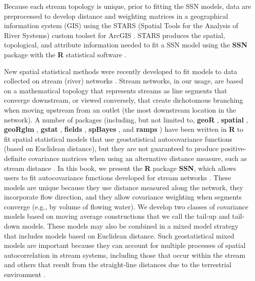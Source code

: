 \documentclass[]{book}
\theoremstyle{definition}
\theoremstyle{definition}
\theoremstyle{definition}
\theoremstyle{remark}
\begin{document}
Because each stream topology is unique, prior to fitting the SSN models,
data are preprocessed to develop distance and weighting matrices in a
geographical information system (GIS) using the STARS (Spatial Tools for
the Analysis of River Systems) custom toolset \citep{Pete:Ver:STAR:2014}
for ArcGIS \citep{ESRI:ArcG:2014}. STARS produces the spatial,
topological, and attribute information needed to fit a SSN model using
the \textbf{SSN} package \citep{Ver:Pete:Clif:Shah:SSN:2014} with the
\textbf{R} statistical software \citep{R:Deve:Core:ALan:2015}.

New spatial statistical methods were recently developed to fit models to
data collected on stream (river) networks \citep{Ver:Pete:Move:2010}.
Stream networks, in our usage, are based on a mathematical topology that
represents streams as line segments that converge downstream, or viewed
conversely, that create dichotomous branching when moving upstream from
an outlet (the most downstream location in the network). A number of
packages (including, but not limited to, \textbf{geoR}
\citep{Ribe:Digg:geoR:2001}, \textbf{spatial}
\citep{Vene:Ripl:mode:2002}, \textbf{geoRglm}
\citep{Chri:Ribe:geoR:2002}, \textbf{gstat} \citep{Pebe:mult:2004},
\textbf{fields} \citep{Fiel:Deve:Team:2006}, \textbf{spBayes}
\citep{Finl:Bane:Carl:spBa:2007}, and \textbf{ramps}
\citep{Smit:Yan:Cowl:unif:2008}) have been written in \textbf{R} to fit
spatial statistical models that use geostatistical autocovariance
functions (based on Euclidean distance), but they are not guaranteed to
produce positive-definite covariance matrices when using an alternative
distance measure, such as stream distance
\citep{Ver:Pete:Theo:spat:2006}. In this book, we present the \textbf{R}
package \textbf{SSN}, which allows users to fit autocovariance functions
developed for stream networks \citep{Ver:Pete:Move:2010}. These models
are unique because they use distance measured along the network, they
incorporate flow direction, and they allow covariance weighting when
segments converge (e.g., by volume of flowing water). We develop two
classes of covariance models based on moving average constructions that
we call the tail-up and tail-down models. These models may also be
combined in a mixed model strategy that includes models based on
Euclidean distance. Such geostatistical mixed models are important
because they can account for multiple processes of spatial
autocorrelation in stream systems, including those that occur within the
stream and others that result from the straight-line distances due to
the terrestrial environment \citep{Ver:Pete:Move:2010}.
\end{document}
